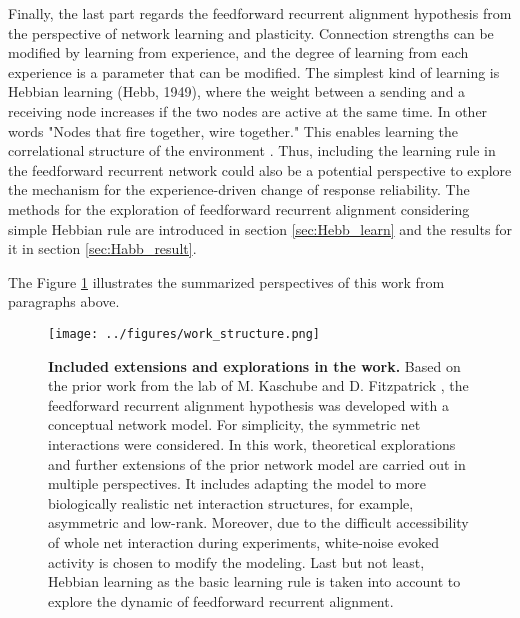 \documentclass[11pt]{article}
\begin{document}
	Finally, the last part regards the feedforward recurrent alignment hypothesis from the perspective of network learning and plasticity.  Connection strengths can be modified by learning from experience, and the degree of learning from each experience is a parameter that can be modified. The simplest kind of learning is Hebbian learning (Hebb, 1949), where the weight between a sending and a receiving node increases if the two nodes are active at the same time. In other words "Nodes that fire together, wire together." This enables learning the correlational structure of the environment \cite{read2021neural}. Thus, including the learning rule in the feedforward recurrent network could also be a potential perspective to explore the mechanism for the experience-driven change of response reliability. The methods for the exploration of feedforward recurrent alignment considering simple Hebbian rule are introduced in section \ref{sec:Hebb_learn} and the results for it in section \ref{sec:Habb_result}. 
	
	The Figure \ref{fig:work_structure} illustrates the summarized perspectives of this work from paragraphs above. 
	\begin{figure}[H]
		\centering
		\texttt{[image: ../figures/work\_structure.png]}
		\caption[Included extensions and explorations in the work]{\textbf{Included extensions and explorations in the work.} Based on the prior work from the lab of M. Kaschube and D. Fitzpatrick \cite{tragenap2023nature}, the feedforward recurrent alignment hypothesis was developed with a conceptual network model. For simplicity, the symmetric net interactions were considered. In this work, theoretical explorations and further extensions of the prior network model are carried out in multiple perspectives. It includes adapting the model to more biologically realistic net interaction structures, for example, asymmetric and low-rank. Moreover, due to the difficult accessibility of whole net interaction during experiments, white-noise evoked activity is chosen to modify the modeling. Last but not least, Hebbian learning as the basic learning rule is taken into account to explore the dynamic of feedforward recurrent alignment.}
		\label{fig:work_structure}
	\end{figure}
	
		

\end{document}
